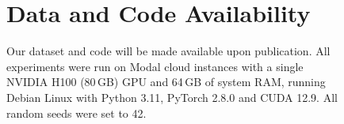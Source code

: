 \documentclass[letterpaper]{article} %
\begin{document}
\begin{figure}[p]
\begin{minipage}[t][\textheight][t]{\textwidth}
\section{Data and Code Availability}
\label{app:datacode}
Our dataset and code will be made available upon publication. All experiments were run on Modal cloud instances with a single NVIDIA H100 (80\,GB) GPU and 64\,GB of system RAM, running Debian Linux with Python 3.11, PyTorch 2.8.0 and CUDA 12.9. All random seeds were set to 42.
\end{minipage}
\end{figure}
\end{document}

